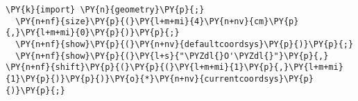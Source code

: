 \begin{Verbatim}[commandchars=\\\{\}]
  \PY{k}{import} \PY{n}{geometry}\PY{p}{;}
  \PY{n+nf}{size}\PY{p}{(}\PY{l+m+mi}{4}\PY{n+nv}{cm}\PY{p}{,}\PY{l+m+mi}{0}\PY{p}{)}\PY{p}{;}
  \PY{n+nf}{show}\PY{p}{(}\PY{n+nv}{defaultcoordsys}\PY{p}{)}\PY{p}{;}
  \PY{n+nf}{show}\PY{p}{(}\PY{l+s}{"\PYZdl{}O'\PYZdl{}"}\PY{p}{,} \PY{n+nf}{shift}\PY{p}{(}\PY{p}{(}\PY{l+m+mi}{1}\PY{p}{,}\PY{l+m+mi}{1}\PY{p}{)}\PY{p}{)}\PY{o}{*}\PY{n+nv}{currentcoordsys}\PY{p}{)}\PY{p}{;}
\end{Verbatim}
